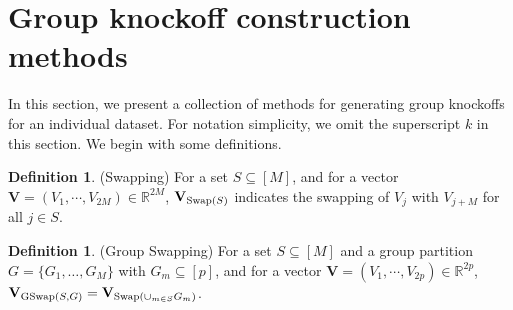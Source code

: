 \documentclass[11pt]{article}
\theoremstyle{plain}
\theoremstyle{definition}
\newtheorem{definition}[theorem]{Definition}
\theoremstyle{remark}
\def\R{\mathbb{R}}
\def\R{\mathbb{R}}
\newcommand{\0}{\mathbf{0}}
\begin{document}
\section{Group knockoff construction methods}\label{sec:groupknockoff}
In this section, we present a collection of methods for generating group knockoffs for an individual dataset. For notation simplicity, we omit the superscript $k$ in this section. We begin with some definitions.

\begin{definition}
(Swapping) For a set $S \subseteq [M]$, and for a vector $\mathbf{V} = (V_1, \cdots, V_{2M}) \in \R^{2M}$, $\mathbf{V}_{\textnormal{Swap}(S)}$ indicates the swapping of $V_j$ with $V_{j+M}$ for all $j \in S$.
\end{definition}
\begin{definition}
(Group Swapping) For a set $S \subseteq [M]$ and a group partition $G=\{G_1,\dots,G_M\}$ with $G_m\subseteq[p]$, and for a vector $\mathbf{V} = (V_1, \cdots, V_{2p}) \in \R^{2p}$, $\mathbf{V}_{\textnormal{GSwap}(S,G)}=\mathbf{V}_{\textnormal{Swap}(\cup_{m\in S}G_m)}$.
\end{definition}
\end{document}
